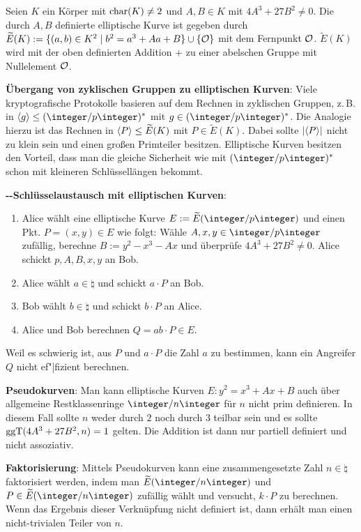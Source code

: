 Seien $K$ ein Körper mit $\operatorname{char}(K) \not= 2$ und $A, B \in K$ mit $4A^3 + 27B^2 \not= 0$.
Die durch $A, B$ definierte elliptische Kurve ist gegeben durch
$\widetilde{E}(K) := \{(a, b) \in K^2 \;|\; b^2 = a^3 + Aa + B\} \cup \{\mathcal{O}\}$
mit dem Fernpunkt $\mathcal{O}$.
$\widetilde{E}(K)$ wird mit der oben definierten
Addition $+$ zu einer abelschen Gruppe mit Nullelement $\mathcal{O}$.

\textbf{Übergang von zyklischen Gruppen zu elliptischen Kurven}:
Viele kryptografische Protokolle basieren auf dem Rechnen in zyklischen Gruppen,
z.\,B. in $\erzeugnis{g} \le (\ZpZ)^\ast$ mit $g \in (\ZpZ)^\ast$.
Die Analogie hierzu ist das Rechnen in $\langle P\rangle \le \widetilde{E}(K)$ mit
$P \in \widetilde{E}(K)$.
Dabei sollte $|\langle P\rangle|$ nicht zu klein sein und einen großen Primteiler besitzen.
Elliptische Kurven besitzen den Vorteil, dass man die gleiche Sicherheit wie mit $(\ZpZ)^\ast$
schon mit kleineren Schlüssellängen bekommt.

\linie

\textbf{--Schlüsselaustausch mit elliptischen Kurven}:
\begin{enumerate}
    \item
    Alice wählt eine elliptische Kurve $E := \widetilde{E}(\ZpZ)$ und einen Pkt.
    $P = (x, y) \in E$ wie folgt:
    Wähle $A, x, y \in \ZpZ$ zufällig, berechne $B := y^2 - x^3 - Ax$ und überprüfe
    $4A^3 + 27B^2 \not= 0$.
    Alice schickt $p, A, B, x, y$ an Bob.
    
    \item
    Alice wählt $a \in \natural$ und schickt $a \cdot P$ an Bob.
    
    \item
    Bob wählt $b \in \natural$ und schickt $b \cdot P$ an Alice.
    
    \item
    Alice und Bob berechnen $Q = ab \cdot P \in E$.
\end{enumerate}
Weil es schwierig ist, aus $P$ und $a \cdot P$ die Zahl $a$ zu bestimmen, kann ein Angreifer
$Q$ nicht ef"|fizient berechnen.

\linie

\textbf{Pseudokurven}:
Man kann elliptische Kurven $E\colon y^2 = x^3 + Ax + B$
auch über allgemeine Restklassenringe $\ZnZ$ für $n$ nicht prim definieren.
In diesem Fall sollte $n$ weder durch $2$ noch durch $3$ teilbar sein und
es sollte $\operatorname{ggT}(4A^3 + 27B^2, n) = 1$ gelten.
Die Addition ist dann nur partiell definiert und nicht assoziativ.

\linie

\textbf{Faktorisierung}:
Mittels Pseudokurven kann eine zusammengesetzte Zahl $n \in \natural$ faktorisiert werden,
indem man $\widetilde{E}(\ZnZ)$ und $P \in \widetilde{E}(\ZnZ)$ zufällig wählt und
versucht, $k \cdot P$ zu berechnen.
Wenn das Ergebnis dieser Verknüpfung nicht definiert ist, dann erhält man einen nicht-trivialen
Teiler von $n$.

\pagebreak
